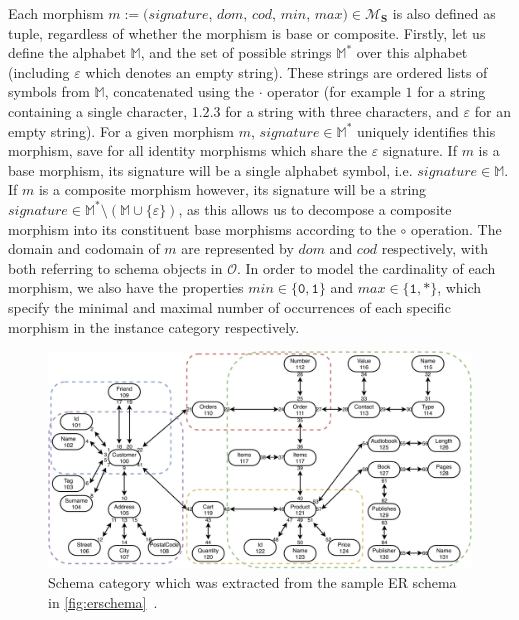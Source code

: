 Each morphism $m := (signature$, $dom$, $cod$, $min$, $max) \in \mathcal{M}_\mathbf{S}$ is also defined as tuple, regardless of whether the morphism is base or composite.
Firstly, let us define the alphabet $\mathbb{M}$, and the set of possible strings $\mathbb{M}^{*}$ over this alphabet (including $\varepsilon$ which denotes an empty string).
These strings are ordered lists of symbols from $\mathbb{M}$, concatenated using the $\cdot$ operator (for example $1$ for a string containing a single character, $1.2.3$ for a string with three characters, and $\varepsilon$ for an empty string).
For a given morphism $m$, $signature \in \mathbb{M}^{*}$ uniquely identifies this morphism, save for all identity morphisms which share the $\varepsilon$ signature.
If $m$ is a base morphism, its signature will be a single alphabet symbol, i.e. $signature \in \mathbb{M}$.
If $m$ is a composite morphism however, its signature will be a string $signature \in \mathbb{M}^{*} \setminus (\mathbb{M} \cup \{\varepsilon\})$, as this allows us to decompose a composite morphism into its constituent base morphisms according to the $\circ$ operation.
The domain and codomain of $m$ are represented by $dom$ and $cod$ respectively, with both referring to schema objects in $\mathcal{O}$.
In order to model the cardinality of each morphism, we also have the properties $min \in \{\mathtt{0}, \mathtt{1}\}$ and $max \in \{\mathtt{1}, \mathtt{*}\}$, which specify the minimal and maximal number of occurrences of each specific morphism in the instance category respectively.

\begin{figure}[!htb]
\centering
\includegraphics[width=\textwidth]{img/fig_schema-categorical.pdf} 
\caption{Schema category which was extracted from the sample ER schema in \cref{fig:erschema}~\cite{unified_representation}.}
\label{fig:schemacategory}
\end{figure}

